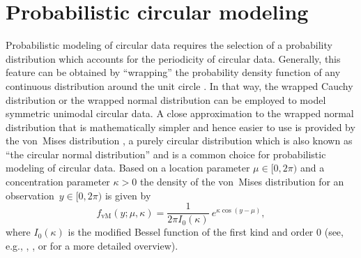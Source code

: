 \documentclass[nojss,shortnames]{jss}
\numberwithin{equation}{section}
\begin{document}
\section{Probabilistic circular modeling}
\label{sec:prob_circ}
Probabilistic modeling of circular data requires the selection of a probability
distribution which accounts for the periodicity of circular data. Generally,
this feature can be obtained by ``wrapping'' the probability density function
of any continuous distribution around the unit circle \citep{Mardia+Jupp:1999}.
In that way, the wrapped Cauchy distribution or the wrapped normal distribution
can be employed to model symmetric unimodal circular data. A close
approximation to the wrapped normal distribution that is mathematically simpler
and hence easier to use is provided by the von~Mises distribution
\citep{Fisher:1993}, a purely circular distribution which is also known as
``the circular normal distribution'' and is a common choice for probabilistic
modeling of circular data. Based on a location parameter $\mu \in [0, 2\pi)$
and a concentration parameter $\kappa > 0$ the density of the von~Mises
distribution for an observation~\mbox{$y \in [0, 2\pi)$} is given by
\begin{equation}
  f_\mathrm{vM}(y; \mu, \kappa) = \frac{1}{2 \pi I_0(\kappa)}~e^{ \kappa \cos(y - \mu)},\label{schlosser:equ_vm}
\end{equation}
where $I_0(\kappa)$ is the modified Bessel function of the first kind and order
$0$ (see, e.g., \citealt{Mardia+Zemroch:1975b}, \citealt{Jammalamadaka+Sengupta:2001}, or
\citealt{Ley+Verdebout:2017} for a more detailed overview).
\end{document}
